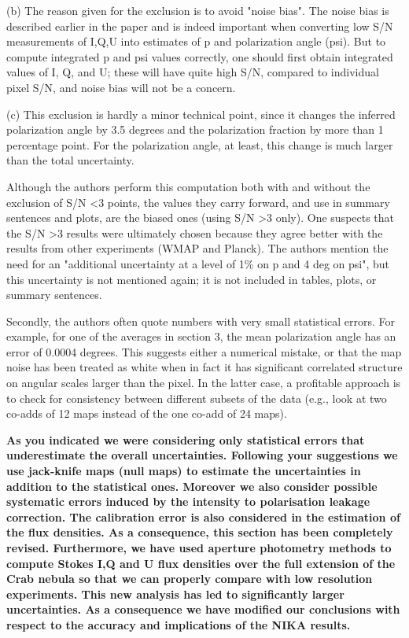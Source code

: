 \documentclass[12pt]{article}
\begin{document}
\begin{enumerate}
(b) The reason given for the exclusion is to avoid "noise bias". The
noise bias is described earlier in the paper and is indeed important
when converting low S/N measurements of I,Q,U into estimates of p and
polarization angle (psi). But to compute integrated p and psi values
correctly, one should first obtain integrated values of I, Q, and U;
these will have quite high S/N, compared to individual pixel S/N, and
noise bias will not be a concern.

(c) This exclusion is hardly a minor technical point, since it changes
the inferred polarization angle by 3.5 degrees and the polarization
fraction by more than 1 percentage point. For the polarization angle,
at least, this change is much larger than the total uncertainty.

Although the authors perform this computation both with and without
the exclusion of S/N \textless 3 points, the values they carry forward, and
use in summary sentences and plots, are the biased ones (using S/N \textgreater 3
only). One suspects that the S/N \textgreater 3 results were ultimately chosen
because they agree better with the results from other experiments
(WMAP and Planck). The authors mention the need for an "additional
uncertainty at a level of 1\% on p and 4 deg on psi", but this
uncertainty is not mentioned again; it is not included in tables,
plots, or summary sentences.


Secondly, the authors often quote numbers with very small statistical
errors. For example, for one of the averages in section 3, the mean
polarization angle has an error of 0.0004 degrees. This suggests
either a numerical mistake, or that the map noise has been
treated as white when in fact it has significant correlated structure
on angular scales larger than the pixel. In the latter case, a
profitable approach is to check for consistency between different
subsets of the data (e.g., look at two co-adds of 12 maps instead of
the one co-add of 24 maps).

\textbf{As you indicated we were considering only statistical errors that underestimate the overall uncertainties. Following your suggestions we use jack-knife maps (null maps) to estimate the uncertainties in addition to the statistical ones. Moreover we also consider possible systematic errors induced by the
intensity to polarisation leakage correction. The calibration error is also considered in the estimation of the flux densities. As a consequence, this section has been completely revised. Furthermore, we have used aperture photometry methods to compute Stokes I,Q and U flux densities over the full extension of the Crab nebula so that we can properly compare with low resolution experiments. This new analysis has led to significantly larger uncertainties. As a consequence we have modified our conclusions with respect to the accuracy and implications of the NIKA results. }


\end{enumerate}
\end{document}
